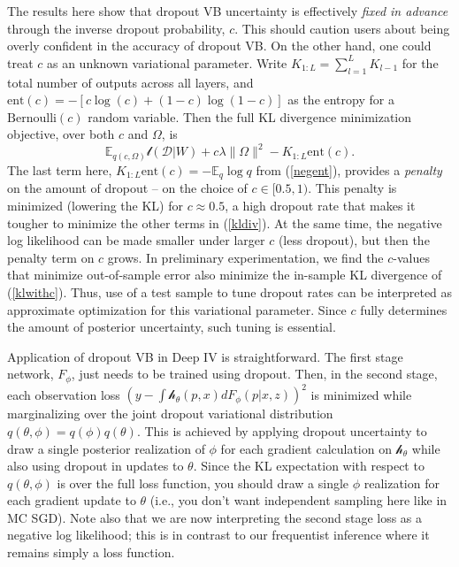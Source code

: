 \documentclass[12pt]{article}
\newcommand{\mc}[1]{\mathcal{#1}}
\newcommand{\mr}[1]{\mathrm{#1}}
\newcommand{\ds}[1]{\mathds{#1}}
\newcommand{\cf}{\ensuremath{\mathscr{h}}}
\begin{document}
The results here show that dropout VB uncertainty is effectively {\it fixed in
advance} through the inverse dropout probability, $c$.  This should caution
users about being overly confident in the accuracy of dropout VB.  On the
other hand, one could treat $c$ as an unknown variational parameter. Write $K_{1:L} = \sum_{l = 1}^L K_{l-1}$ for the total number of outputs across all layers, and $\mr{ent}(c) = -\left[c\log(c)
	+ (1-c)\log(1-c)\right]$ as the entropy for a $\mr{Bernoulli}(c)$ random variable.  Then the full KL divergence minimization objective, over both $c$  and $\Omega$, is 
\begin{equation}\label{klwithc}
\ds{E}_{q(c,\Omega)} \mathscr{l}(\mc{D}|W) +  c\lambda\| \Omega \|^2 
- K_{1:L}\mr{ent}\left(c\right).
 \end{equation}  
The last term here, $K_{1:L}\mr{ent}\left(c\right)=
-\ds{E}_q\log q$ from (\ref{negent}), provides a {\it penalty} on the amount of dropout -- on
the choice of $c \in [0.5,1)$.  This penalty is minimized (lowering the KL)
for $c \approx 0.5$, a high dropout rate that makes it tougher to minimize the
other terms in (\ref{kldiv}).  At the same time, the negative log likelihood
can be made smaller under larger $c$ (less dropout), but
then the penalty term on $c$ grows.  In preliminary experimentation, we find  the $c$-values that minimize out-of-sample error also minimize the in-sample KL divergence of (\ref{klwithc}).  Thus, use of a test sample to tune dropout rates can be interpreted as approximate optimization for this variational parameter.  Since $c$ fully determines the amount of posterior uncertainty, such tuning is essential.

Application of dropout VB in Deep IV is straightforward.  The first stage network, $F_\phi$, just needs to be trained using dropout.  Then, in the second stage, each observation loss
$\left(y - \int \cf_\theta(p,x)dF_\phi(p|x,z)\right)^2$ is minimized while marginalizing over the joint dropout  variational distribution  $q(\theta,\phi) = q(\phi)q(\theta)$.  This is achieved by applying dropout uncertainty to draw a  single posterior realization of $\phi$ for each gradient calculation on $\cf_\theta$ while also using dropout in updates to $\theta$.
Since the KL expectation with respect to $q(\theta,\phi)$ is over the full loss function, you should  draw a single $\phi$ realization for each gradient update to $\theta$ (i.e., you don't want independent sampling here like in MC SGD). Note also that we are now interpreting the second stage loss as a negative log likelihood; this is in contrast to our frequentist inference where it remains simply a loss function. 
\end{document}
